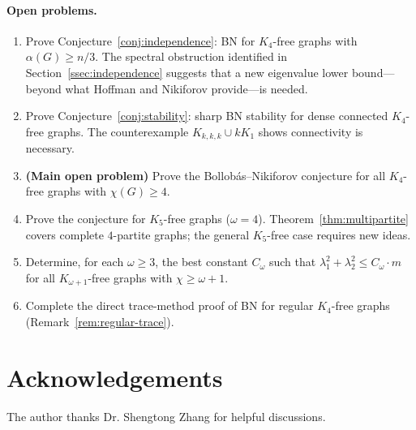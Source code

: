\documentclass[preprint,12pt]{elsarticle}
\theoremstyle{plain}
\theoremstyle{definition}
\begin{document}
\paragraph{Open problems.}
\begin{enumerate}
  \item Prove Conjecture~\ref{conj:independence}: BN for $K_4$-free graphs
        with $\alpha(G) \geq n/3$.
        The spectral obstruction identified in
        Section~\ref{ssec:independence} suggests that a new eigenvalue
        lower bound---beyond what Hoffman and Nikiforov provide---is needed.

  \item Prove Conjecture~\ref{conj:stability}: sharp BN stability for
        dense connected $K_4$-free graphs.
        The counterexample $K_{k,k,k} \cup kK_1$ shows connectivity is
        necessary.

  \item \textbf{(Main open problem)} Prove the Bollob\'as--Nikiforov
        conjecture for all $K_4$-free graphs with $\chi(G) \geq 4$.

  \item Prove the conjecture for $K_5$-free graphs ($\omega = 4$).
        Theorem~\ref{thm:multipartite} covers complete $4$-partite graphs;
        the general $K_5$-free case requires new ideas.

  \item Determine, for each $\omega \geq 3$, the best constant $C_\omega$
        such that $\lambda_1^2 + \lambda_2^2 \leq C_\omega \cdot m$ for all
        $K_{\omega+1}$-free graphs with $\chi \geq \omega+1$.

  \item Complete the direct trace-method proof of BN for regular
        $K_4$-free graphs (Remark~\ref{rem:regular-trace}).
\end{enumerate}

\section*{Acknowledgements}
The author thanks Dr. Shengtong Zhang for helpful discussions.
\end{document}
